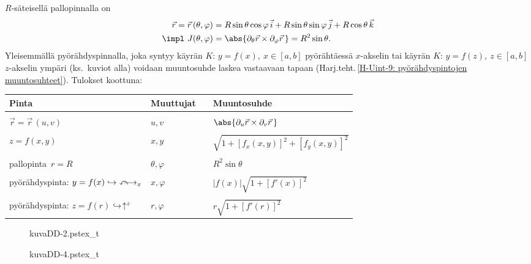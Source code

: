 $R$-säteisellä pallopinnalla on
\begin{align*}
\vec r = \vec r\,(\theta,\varphi)
      &= R\sin\theta\cos\varphi\,\vec i+R\sin\theta\sin\varphi\,\vec j+R\cos\theta\,\vec k \\
\impl\ J(\theta,\varphi) 
      &= \abs{\partial_\theta\vec r\times\partial_\varphi\vec r\,}
       = R^2\sin\theta.
\end{align*}
Yleisemmällä pyörähdyspinnalla, joka syntyy käyrän $K:\,y=f(x),\ x\in[a,b]$ pyörähtäessä
$x$-akselin tai käyrän $K:\,y=f(z),\ z\in[a,b]$ $z$-akselin ympäri (ks.\ kuviot alla) voidaan
muuntosuhde laskea vastaavaan tapaan
(Harj.teht.\,\ref{H-Uint-9: pyörähdyspintojen muuntosuhteet}). Tulokset koottuna:
%
\vspace{2mm}
\begin{center}
\begin{tabular}{lll}
Pinta & Muuttujat & $\quad$Muuntosuhde \\ \hline \\
$\vec r=\vec r\,(u,v)$ & $u,v$ & $\quad \abs{\partial_u\vec r \times \partial_v\vec r\,}$ \\ \\
$z=f(x,y)$ & $x,y$ & $\quad \sqrt{1+[f_x(x,y)]^2+[f_y(x,y)]^2}$ \\ \\
pallopinta $\,r=R$& $\theta,\varphi$ & $\quad R^2\sin\theta$ \\ \\
\parbox{3.5cm}{pyörähdyspinta: 
$y=f(x) \hookrightarrow\ \curvearrowleft \negthickspace\negthickspace \longrightarrow_x$} & 
$x,\varphi$ & $\quad |f(x)|\sqrt{1+[f'(x)]^2}$ \\ \\
\parbox{3.5cm}{pyörähdyspinta: 
$z=f(r) \hookrightarrow$\ \raisebox{-0.2cm}{$\circlearrowleft$}$\negthinspace \negthinspace 
\negmedspace \negthinspace \uparrow^z$} & $r,\varphi$ & $\quad r\sqrt{1+[f'(r)]^2}$

\end{tabular}
\end{center}
\begin{multicols}{2}
\begin{figure}[H]
\vspace{1cm}
\begin{center}
{kuvaDD-2.pstex_t}
\end{center}
\end{figure}
\begin{figure}[H]
\begin{center}
{kuvaDD-4.pstex_t}
\end{center}
\end{figure}
\end{multicols}
